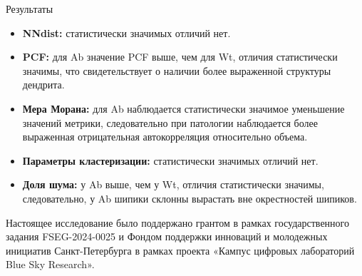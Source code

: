 \documentclass[final]{beamer}
\newlength{\colwidth}
\begin{document}
\begin{frame}[t]
\begin{columns}[t]
\begin{column}{\colwidth}
\begin{block}{Результаты}
    \begin{itemize}
        \item \textbf{NNdist:} статистически значимых отличий нет.
        \item \textbf{PCF:} для Ab значение PCF выше, чем для Wt, отличия статистически значимы, что свидетельствует о наличии более выраженной структуры дендрита.
        \item \textbf{Мера Морана:} для Ab наблюдается статистически значимое уменьшение значений метрики, следовательно при патологии наблюдается более выраженная отрицательная автокорреляция относительно объема. 
        \item \textbf{Параметры кластеризации:} статистически значимых отличий нет. 
        \item \textbf{Доля шума:} у Ab выше, чем у Wt, отличия статистически значимы, следовательно, у Ab шипики склонны вырастать вне окрестностей шипиков.
    \end{itemize}

  \end{block}

  Настоящее исследование было поддержано грантом в рамках государственного задания FSEG-2024-0025 и Фондом поддержки инноваций и молодежных инициатив Санкт-Петербурга в рамках проекта «Кампус цифровых лабораторий Blue Sky Research».







\end{column}
\end{columns}
\end{frame}
\end{document}
